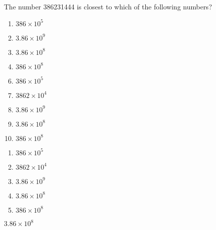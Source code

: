 





   The number 386231444 is closest to which of the following numbers?


\ifsat
	\begin{enumerate}[label=\Alph*)]
		\item   $386\times 10^{5}$
		\item  $3.86\times 10^{9}$
		\item  $3.86\times 10^{8}$ %
		\item  $386\times 10^{8}$
	\end{enumerate}
\else
\fi

\ifacteven
	\begin{enumerate}[label=\textbf{\Alph*.},itemsep=\fill,align=left]
		\setcounter{enumii}{5}
		\item   $386\times 10^{5}$
		\item  $3862\times 10^{4}$
		\item  $3.86\times 10^{9}$
		\addtocounter{enumii}{1}
		\item  $3.86\times 10^{8}$ %
		\item  $386\times 10^{8}$
	\end{enumerate}
\else
\fi

\ifactodd
	\begin{enumerate}[label=\textbf{\Alph*.},itemsep=\fill,align=left]
		\item   $386\times 10^{5}$
		\item  $3862\times 10^{4}$
		\item  $3.86\times 10^{9}$
		\item  $3.86\times 10^{8}$ %
		\item  $386\times 10^{8}$
	\end{enumerate}
\else
\fi

\ifgridin
  $3.86\times 10^{8}$ %
		
\else
\fi

